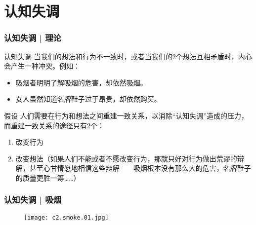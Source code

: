 \section{认知失调}
\begin{frame}
  \frametitle{认知失调 | 理论}
  \begin{block}{认知失调}
    当我们的想法和行为不一致时，或者当我们的2个想法互相矛盾时，内心会产生一种冲突。例如：
    \begin{itemize}
      \item 吸烟者明明了解吸烟的危害，却依然吸烟。
      \item 女人虽然知道名牌鞋子过于昂贵，却依然购买。
    \end{itemize}
  \end{block}
  \pause
  \begin{block}{假设}
    人们需要在行为和想法之间重建一致关系，以消除“认知失调”造成的压力，而重建一致关系的途径只有2个：
    \begin{enumerate}
      \item 改变行为
      \item 改变想法（如果人们不能或者不愿改变行为，那就只好对行为做出荒谬的辩解，甚至心甘情愿地相信这些辩解——吸烟根本没有那么大的危害，名牌鞋子的质量更胜一筹……）
    \end{enumerate}
  \end{block}
\end{frame}

\begin{frame}
  \frametitle{认知失调 | 吸烟}
  \begin{figure}
    \centering
    \texttt{[image: c2.smoke.01.jpg]}
  \end{figure}
\end{frame}


